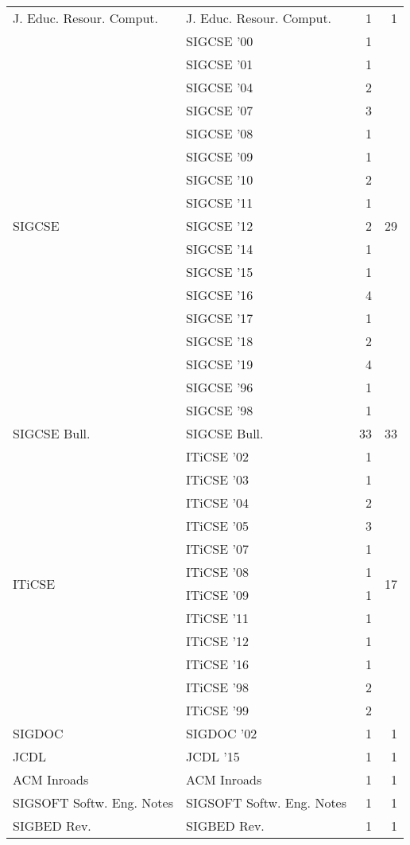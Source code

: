 \begin{table*}[t]
\begin{tabular}{llrr}
\multirow{1}{*}{J. Educ. Resour. Comput.} & J. Educ. Resour. Comput. & 1 & \multirow{1}{*}{1}\\
\multirow{17}{*}{SIGCSE } & SIGCSE '00 & 1 & \multirow{17}{*}{29}\\
& SIGCSE '01 & 1 &\\
& SIGCSE '04 & 2 &\\
& SIGCSE '07 & 3 &\\
& SIGCSE '08 & 1 &\\
& SIGCSE '09 & 1 &\\
& SIGCSE '10 & 2 &\\
& SIGCSE '11 & 1 &\\
& SIGCSE '12 & 2 &\\
& SIGCSE '14 & 1 &\\
& SIGCSE '15 & 1 &\\
& SIGCSE '16 & 4 &\\
& SIGCSE '17 & 1 &\\
& SIGCSE '18 & 2 &\\
& SIGCSE '19 & 4 &\\
& SIGCSE '96 & 1 &\\
& SIGCSE '98 & 1 &\\
\multirow{1}{*}{SIGCSE Bull.} & SIGCSE Bull. & 33 & \multirow{1}{*}{33}\\
\multirow{12}{*}{ITiCSE } & ITiCSE '02 & 1 & \multirow{12}{*}{17}\\
& ITiCSE '03 & 1 &\\
& ITiCSE '04 & 2 &\\
& ITiCSE '05 & 3 &\\
& ITiCSE '07 & 1 &\\
& ITiCSE '08 & 1 &\\
& ITiCSE '09 & 1 &\\
& ITiCSE '11 & 1 &\\
& ITiCSE '12 & 1 &\\
& ITiCSE '16 & 1 &\\
& ITiCSE '98 & 2 &\\
& ITiCSE '99 & 2 &\\
\multirow{1}{*}{SIGDOC } & SIGDOC '02 & 1 & \multirow{1}{*}{1}\\
\multirow{1}{*}{JCDL } & JCDL '15 & 1 & \multirow{1}{*}{1}\\
\multirow{1}{*}{ACM Inroads} & ACM Inroads & 1 & \multirow{1}{*}{1}\\
\multirow{1}{*}{SIGSOFT Softw. Eng. Notes} & SIGSOFT Softw. Eng. Notes & 1 & \multirow{1}{*}{1}\\
\multirow{1}{*}{SIGBED Rev.} & SIGBED Rev. & 1 & \multirow{1}{*}{1}\\

\end{tabular}
\end{table*}
